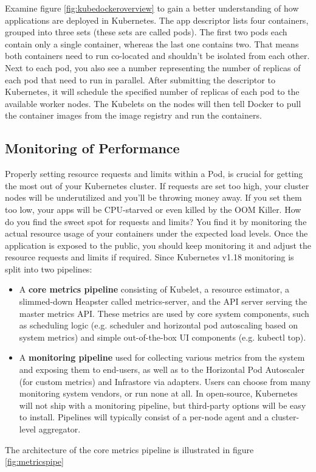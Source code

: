 Examine figure \ref{fig:kubedockeroverview} to gain a better understanding of how applications are deployed in Kubernetes. The app descriptor lists four containers, grouped into three sets (these sets are called pods). The first two pods each contain only a single container, whereas the last one contains two. That means both containers need to run co-located and shouldn't be isolated from each other. Next to each pod, you also see a number representing the number of replicas of each pod that need to run in parallel. After submitting the descriptor to Kubernetes, it will schedule the specified number of replicas of each pod to the available worker nodes. The Kubelets on the nodes will then tell Docker to pull the container images from the image registry and run the containers.


\subsection{Monitoring of Performance}
Properly setting resource requests and limits within a Pod, is crucial for getting the most out of your Kubernetes cluster. If requests are set too high, your cluster nodes will be underutilized and you’ll be throwing money away. If you set them too low, your apps will be CPU-starved or even killed by the OOM Killer. How do you find the sweet spot for requests and limits?
You find it by monitoring the actual resource usage of your containers under the expected load levels. Once the application is exposed to the public, you should keep monitoring it and adjust the resource requests and limits if required.
Since Kubernetes v1.18 monitoring is split into two pipelines:
\begin{itemize}
	\item A \textbf{core metrics pipeline} consisting of Kubelet, a resource estimator, a slimmed-down Heapster called metrics-server, and the API server serving the master metrics API. These metrics are used by core system components, such as scheduling logic (e.g. scheduler and horizontal pod autoscaling based on system metrics) and simple out-of-the-box UI components (e.g. kubectl top). 
	\item A \textbf{monitoring pipeline} used for collecting various metrics from the system and exposing them to end-users, as well as to the Horizontal Pod Autoscaler (for custom metrics) and Infrastore via adapters. Users can choose from many monitoring system vendors, or run none at all. In open-source, Kubernetes will not ship with a monitoring pipeline, but third-party options will be easy to install. Pipelines will typically consist of a per-node agent and a cluster-level aggregator. 
\end{itemize}
The architecture of the core metrics pipeline is illustrated in figure \ref{fig:metricspipe}

